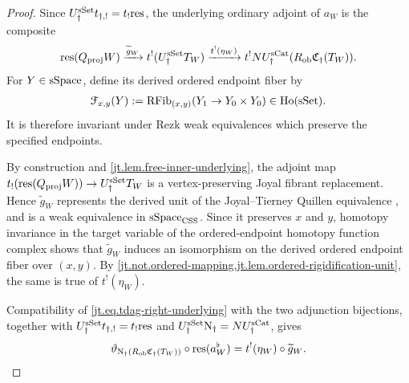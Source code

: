 \documentclass[a4paper,dvipdfmx,11pt]{amsart}
\begin{document}
\begin{proof}
  Since $U_{\dag}^{\mathrm{sSet}} t_{\dag,!}=t_!\mathrm{res}$, the underlying ordinary adjoint of $a_W$ is the composite
  \begin{align}
    \mathrm{res}(Q_{\mathrm{proj}}W)
    \xrightarrow{\widetilde g_W}
    t^!(U_{\dag}^{\mathrm{sSet}} T_W)
    \xrightarrow{t^!(\eta_W)}
    t^!NU_{\dag}^{\mathrm{sCat}}
    (R_{\mathrm{ob}}\mathfrak{C}_{\dag}(T_W)).
  \end{align}
  For $Y \in \mathrm{sSpace}$, define its derived ordered endpoint fiber by
  \begin{align}
    \mathcal{F}_{x,y}(Y)
    :=
    \mathrm{RFib}_{(x,y)}(
      Y_1
      \to
      Y_0\times Y_0)
    \in
    \mathrm{Ho}(\mathrm{sSet}).
  \end{align}
  It is therefore invariant under Rezk weak equivalences which preserve the specified endpoints.

  By construction and \cref{jt.lem.free-inner-underlying}, the adjoint map $ t_!(\mathrm{res}(Q_{\mathrm{proj}}W)) \to U_{\dag}^{\mathrm{sSet}} T_W$ is a vertex-preserving Joyal fibrant replacement.
  Hence $\widetilde g_W$ represents the derived unit of the Joyal--Tierney Quillen equivalence \cite[Theorem~4.12]{JT06}, and is a weak equivalence in $\mathrm{sSpace}_{\mathrm{CSS}}$.
  Since it preserves $x$ and $y$, homotopy invariance in the target variable of the ordered-endpoint homotopy function complex shows that $\widetilde g_W$ induces an isomorphism on the derived ordered endpoint fiber over $(x,y)$.
  By \cref{jt.not.ordered-mapping,jt.lem.ordered-rigidification-unit}, the same is true of $t^!(\eta_W)$.

  Compatibility of \eqref{jt.eq.tdag-right-underlying} with the two adjunction bijections, together with $U_{\dag}^{\mathrm{sSet}} t_{\dag,!}=t_!\mathrm{res}$ and $U_{\dag}^{\mathrm{sSet}} \mathrm{N}_{\dag}=NU_{\dag}^{\mathrm{sCat}}$, gives 
  \begin{align}\label{jt.eq.underlying-adjoint-compatibility}
    \vartheta_{\mathrm{N}_{\dag}(R_{\mathrm{ob}}\mathfrak{C}_{\dag}(T_W))}
    \circ
    \mathrm{res}(a_W^{\flat})
    =
    t^!(\eta_W)
    \circ
    \widetilde g_W.
  \end{align}


\end{proof}
\end{document}
